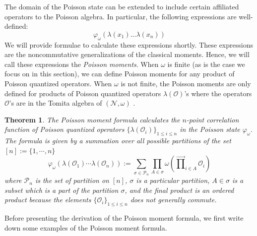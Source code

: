 \documentclass[a4paper,11pt]{article}
\newtheorem{theorem}{Theorem}
\theoremstyle{definition}
\numberwithin{equation}{section}
\newcommand{\lb}{\left(}
\newcommand{\rb}{\right)}
\begin{document}
The domain of the Poisson state can be extended to include certain affiliated operators to the Poisson algebra. In particular, the following expressions are well-defined:
\begin{equation}
    \varphi_\omega\lb \lambda(x_1)...\lambda(x_n) \rb
\end{equation}
We will provide formulae to calculate these expressions shortly. These expressions are the noncommutative generalizations of the classical moments. Hence, we will call these expressions the \textit{Poisson moments}. When $\omega$ is finite (as is the case we focus on in this section), we can define Poisson moments for any product of Poisson quantized operators. When $\omega$ is not finite, the Poisson moments are only defined for products of Poisson quantized operators $\lambda(\mathcal{O})$'s where the operators 
$\mathcal{O}$'s are in the Tomita algebra of $(\mathcal{N},\omega)$ \cite{T}. 
\begin{theorem}
    The Poisson moment formula calculates the $n$-point correlation function of Poisson quantized operators $\{\lambda(\mathcal{O}_i)\}_{1\leq i\leq n}$ in the Poisson state $\varphi_\omega$. The formula is given by a summation over all possible partitions of the set $[n]:=\{1,\cdots,n\}$
    \begin{equation}
        \varphi_\omega(\lambda(\mathcal{O}_1)\cdots\lambda(\mathcal{O}_n)):=\sum_{\sigma\in\mathcal{P}_n}\prod_{A\in\sigma}\omega(\overrightarrow{\prod}_{i\in A}\mathcal{O}_i)
    \end{equation}
    where $\mathcal{P}_n$ is the set of partition on $[n]$, $\sigma$ is a particular partition, $A\in\sigma$ is a subset which is a part of the partition $\sigma$, and the final product is an ordered product because the elements $\{\mathcal{O}_i\}_{1\leq i\leq n}$ does not generally commute.
\end{theorem}
Before presenting the derivation of the Poisson moment formula, we first write down some examples of the Poisson moment formula.
\end{document}
